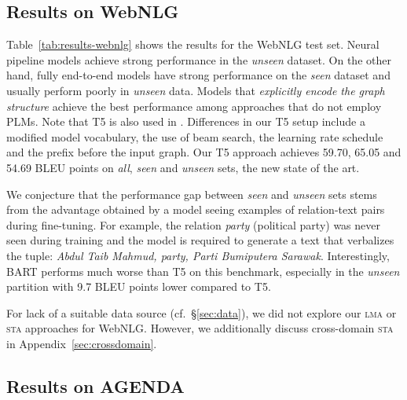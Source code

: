 \documentclass[11pt]{article}
\begin{document}
\begin{table}[t]
\subsection{Results on WebNLG}



Table~\ref{tab:results-webnlg} shows the results for the WebNLG test set. Neural pipeline models \cite{moryossef-etal-2019-step, castro-ferreira-etal-2019-neural} achieve strong performance in the \emph{unseen} dataset. On the other hand, fully end-to-end models \cite{ribeiro-etal-2020-modeling,schmitt2020modeling} have strong performance on the \emph{seen} dataset and usually perform poorly in \textit{unseen} data. Models that \emph{explicitly encode the graph structure} \cite{ribeiro-etal-2020-modeling, zhao-etal-2020-bridging} achieve the best performance among approaches that do not employ PLMs. Note that T5 is also used in \citet{kale2020texttotext}. Differences in our T5 setup include a modified model vocabulary, the use of beam search, the learning rate schedule and the prefix before the input graph. Our T5 approach achieves 59.70, 65.05 and 54.69 BLEU points on \emph{all}, \emph{seen} and \emph{unseen} sets, the new state of the art. 

We conjecture that the performance gap between \emph{seen} and \emph{unseen} sets stems from the advantage obtained by a model seeing examples of relation-text pairs during fine-tuning. For example, the relation \emph{party} (political party) was never seen during training and the model is required to generate a text that verbalizes the tuple: \emph{Abdul Taib Mahmud, party, Parti Bumiputera Sarawak}. Interestingly, BART performs much worse than T5 on this benchmark, especially in the \emph{unseen} partition with 9.7 BLEU points lower compared to T5.

For lack of a suitable data source (cf.\ \S\ref{sec:data}), we did not explore our \textsc{lma} or \textsc{sta} approaches for WebNLG.
However, we additionally discuss cross-domain \textsc{sta} in Appendix~\ref{sec:crossdomain}.









\subsection{Results on AGENDA}



\end{table}
\end{document}

